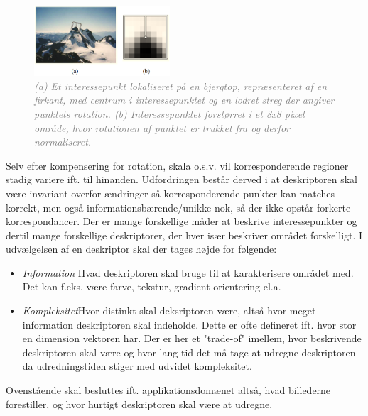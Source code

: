 \begin{figure}[H]
    \centering
    \includegraphics[width=0.45\textwidth]{fig/21.png}
    \vspace{-0.5em} 
    \begin{center}
    \caption{\textcolor{gray}{\footnotesize \textit{
   (a) Et interessepunkt lokaliseret på en bjergtop,  repræsenteret af en firkant, med centrum i interessepunktet og en lodret streg der angiver punktets rotation. (b) Interessepunktet forstørret i et 8x8 pixel område, hvor rotationen af punktet er trukket fra og derfor normaliseret.}}}
    \label{fig:bjerg}
     \end{center}
  \end{figure}
       \vspace{-2.5em}
\noindent
Selv efter kompensering for rotation, skala o.s.v. vil korresponderende regioner stadig variere ift. til hinanden. Udfordringen består derved i at deskriptoren skal være invariant overfor ændringer så korresponderende punkter kan matches korrekt, men også informationsbærende/unikke nok, så der ikke opstår forkerte korrespondancer. Der er mange forskellige måder at beskrive interessepunkter og dertil mange forskellige deskriptorer, der hver især beskriver området forskelligt. I udvælgelsen af en deskriptor skal der tages højde for følgende:
\begin{itemize}
\item{ \textit{Information} Hvad deskriptoren skal bruge til at karakterisere området med. Det kan f.eks. være farve, tekstur, gradient orientering el.a.}
\item{ \textit{Kompleksitet}Hvor distinkt skal deksriptoren være, altså hvor meget information deskriptoren skal indeholde. Dette er ofte defineret ift. hvor stor en dimension vektoren har. Der er her et "trade-of" imellem, hvor beskrivende deskriptoren skal være og hvor lang tid det må tage at udregne deskriptoren da udredningstiden stiger med udvidet kompleksitet.}
\end{itemize}
Ovenstående skal besluttes ift. applikationsdomænet altså, hvad billederne forestiller, og hvor hurtigt deskriptoren skal være at udregne.